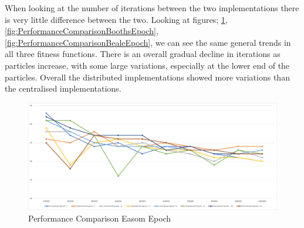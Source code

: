 \documentclass[oneside,12pt]{book}
\begin{document}
\begin{table}[H]
  \caption{TTS Results for 1,000,000 Particles}    
  \label{tab:TTSOneMillion}%
\end{table}%

When looking at the number of iterations between the two implementations there is very little difference between the two. Looking at figures; \ref{fig:PerformanceComparisonEasomEpoch}, \ref{fig:PerformanceComparisonBoothsEpoch}, \ref{fig:PerformanceComparisonBealeEpoch}, we can see the same general trends in all three fitness functions. There is an overall gradual decline in iterations as particles increase, with some large variations, especially at the lower end of the particles. Overall the distributed implementations showed more variations than the centralised implementations. 

\begin{figure}[H]
    \centering
    \includegraphics[scale=0.45]{Images/Graphs/PerformanceComparisonEasomEpoch.png}
    \caption{Performance Comparison Easom Epoch}
    \label{fig:PerformanceComparisonEasomEpoch}
\end{figure}
\end{document}
